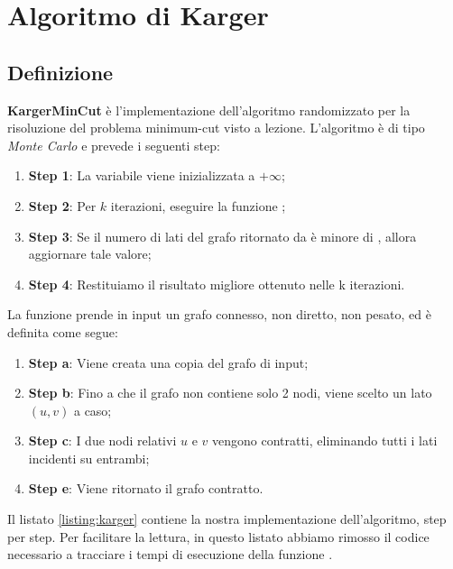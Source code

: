 \section{Algoritmo di Karger}
\label{cap:algorithm-karger}

\subsection{Definizione}
\label{sub:karger-definition}

\textbf{KargerMinCut} è l'implementazione dell'algoritmo randomizzato per la risoluzione del problema minimum-cut visto a lezione. L'algoritmo è di tipo \textit{Monte Carlo} e prevede i seguenti step:

\begin{enumerate}
    \item \textbf{Step 1}: La variabile  viene inizializzata a $+\infty$;
    \item \textbf{Step 2}: Per $k$ iterazioni, eseguire la funzione ;
    \item \textbf{Step 3}: Se il numero di lati del grafo ritornato da  è minore di , allora  aggiornare tale valore;
    \item \textbf{Step 4}: Restituiamo il risultato migliore ottenuto nelle k iterazioni.
\end{enumerate}

\noindent La funzione  prende in input un grafo connesso, non diretto, non pesato, ed è definita come segue:

\begin{enumerate}
    \item \textbf{Step a}: Viene creata una copia del grafo di input;
    \item \textbf{Step b}: Fino a che il grafo non contiene solo 2 nodi, viene scelto un lato $(u, v)$ a caso;
    \item \textbf{Step c}: I due nodi relativi $u$ e $v$ vengono contratti, eliminando tutti i lati incidenti su entrambi;
    \item \textbf{Step e}: Viene ritornato il grafo contratto.
\end{enumerate}

\noindent Il listato \ref{listing:karger} contiene la nostra implementazione dell'algoritmo, step per step. Per facilitare la lettura, in questo listato abbiamo rimosso il codice necessario a tracciare i tempi di esecuzione della funzione .\\


